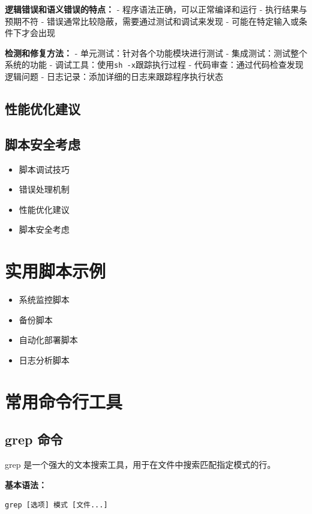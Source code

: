 \documentclass[12pt,UTF8]{ctexbook}
\begin{document}
\textbf{逻辑错误和语义错误的特点：}
- 程序语法正确，可以正常编译和运行
- 执行结果与预期不符
- 错误通常比较隐蔽，需要通过测试和调试来发现
- 可能在特定输入或条件下才会出现

\textbf{检测和修复方法：}
- 单元测试：针对各个功能模块进行测试
- 集成测试：测试整个系统的功能
- 调试工具：使用\texttt{sh -x}跟踪执行过程
- 代码审查：通过代码检查发现逻辑问题
- 日志记录：添加详细的日志来跟踪程序执行状态

\subsection{性能优化建议}
\subsection{脚本安全考虑}

\begin{itemize}
    \item 脚本调试技巧
    \item 错误处理机制
    \item 性能优化建议
    \item 脚本安全考虑
\end{itemize}

\section{实用脚本示例}
\begin{itemize}
    \item 系统监控脚本
    \item 备份脚本
    \item 自动化部署脚本
    \item 日志分析脚本
\end{itemize}

\section{常用命令行工具}

\subsection{grep 命令}
grep 是一个强大的文本搜索工具，用于在文件中搜索匹配指定模式的行。

\textbf{基本语法：}
\begin{verbatim}
grep [选项] 模式 [文件...]
\end{verbatim}
\end{document}
